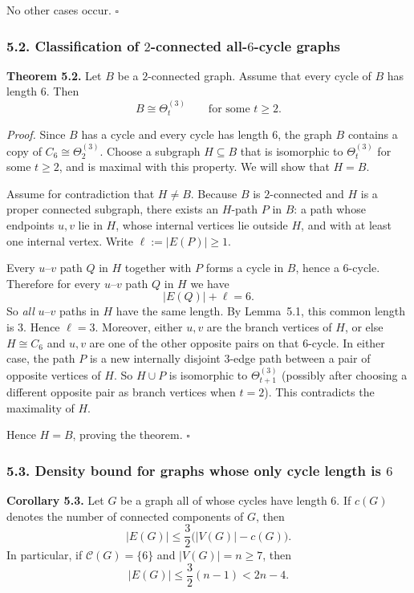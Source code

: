 No other cases occur. \hfill$\square$

\subsubsection*{5.2. Classification of $2$-connected all-$6$-cycle graphs}

\textbf{Theorem 5.2.}
Let $B$ be a $2$-connected graph.
Assume that every cycle of $B$ has length $6$.
Then
\[
B\cong \Theta_t^{(3)}
\qquad\text{for some }t\ge 2.
\]

\medskip
\textit{Proof.}
Since $B$ has a cycle and every cycle has length $6$, the graph $B$ contains a copy of $C_6\cong \Theta_2^{(3)}$.
Choose a subgraph $H\subseteq B$ that is isomorphic to $\Theta_t^{(3)}$ for some $t\ge 2$, and is maximal with this property.
We will show that $H=B$.

Assume for contradiction that $H\ne B$.
Because $B$ is $2$-connected and $H$ is a proper connected subgraph, there exists an $H$-path $P$ in $B$: a path whose endpoints $u,v$ lie in $H$, whose internal vertices lie outside $H$, and with at least one internal vertex.
Write $\ell:=|E(P)|\ge 1$.

Every $u$--$v$ path $Q$ in $H$ together with $P$ forms a cycle in $B$, hence a $6$-cycle.
Therefore for every $u$--$v$ path $Q$ in $H$ we have
\[
|E(Q)|+\ell=6.
\]
So \emph{all} $u$--$v$ paths in $H$ have the same length.
By Lemma~5.1, this common length is $3$.
Hence $\ell=3$.
Moreover, either $u,v$ are the branch vertices of $H$, or else $H\cong C_6$ and $u,v$ are one of the other opposite pairs on that $6$-cycle.
In either case, the path $P$ is a new internally disjoint $3$-edge path between a pair of opposite vertices of $H$.
So $H\cup P$ is isomorphic to $\Theta_{t+1}^{(3)}$ (possibly after choosing a different opposite pair as branch vertices when $t=2$).
This contradicts the maximality of $H$.

Hence $H=B$, proving the theorem. \hfill$\square$

\subsubsection*{5.3. Density bound for graphs whose only cycle length is $6$}

\textbf{Corollary 5.3.}
Let $G$ be a graph all of whose cycles have length $6$.
If $c(G)$ denotes the number of connected components of $G$, then
\[
|E(G)|\le \frac32\bigl(|V(G)|-c(G)\bigr).
\]
In particular, if $\mathcal C(G)=\{6\}$ and $|V(G)|=n\ge 7$, then
\[
|E(G)|\le \frac32(n-1)<2n-4.
\]


